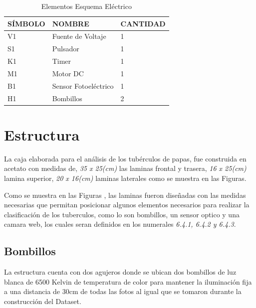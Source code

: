 		\begin{table}[ht]
		\centering
		\begin{tabular}{|p{2cm}|p{5cm}||p{3cm}|}
			\hline
			SÍMBOLO & NOMBRE & CANTIDAD \\ 
			\hline
			 V1 & Fuente de Voltaje & 1 \\
			\hline
			 S1 & Pulsador & 1 \\
			\hline
			 K1 & Timer & 1 \\
			\hline
			 M1 & Motor DC & 1 \\
			\hline
			 B1 & Sensor Fotoeléctrico & 1 \\
			\hline
			 H1 & Bombillos & 2 \\
			\hline
		\end{tabular}	
		\caption{Elementos Esquema Eléctrico}
		\label{table:esquema}
		\end{table}	
		
\newpage	
	\section{Estructura}
		La caja elaborada para el análisis de los tubérculos de papas, fue construida en acetato con medidas de, \textit{35 x 25(cm)} las laminas frontal y trasera, \textit{16 x 25(cm)} lamina superior, \textit{20 x 16(cm)} laminas laterales como se muestra en las Figuras.
	
		Como se muestra en las Figuras , las laminas fueron diseñadas con las medidas necesarias que permitan posicionar algunos elementos necesarios para realizar la clasificación de los tuberculos, como lo son bombillos, un sensor optico y una camara web, los cuales seran definidos en los numerales \textit{6.4.1, 6.4.2 y 6.4.3}.
		\subsection{Bombillos}
			La estructura cuenta con dos agujeros donde se ubican dos bombillos de luz blanca de 6500 Kelvin de temperatura de color para mantener la iluminación fija a una distancia de 30cm de todas las fotos al igual que se tomaron durante la construcción del Dataset.
